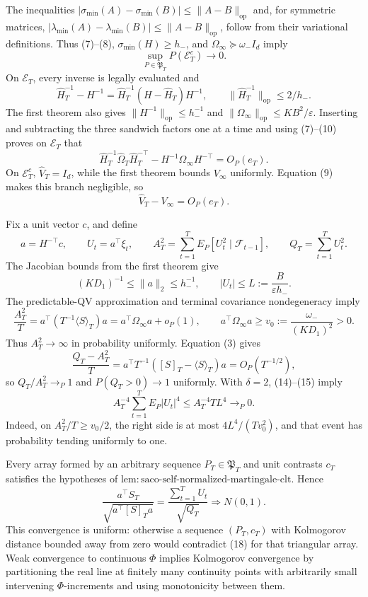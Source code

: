 The inequalities \(|\sigma_{\min}(A)-\sigma_{\min}(B)|\le\|A-B\|_{\mathrm{op}}\) and, for symmetric matrices, \(|\lambda_{\min}(A)-\lambda_{\min}(B)|\le\|A-B\|_{\mathrm{op}}\), follow from their variational definitions. Thus (7)--(8), \(\sigma_{\min}(H)\ge h_-\), and \(\Omega_\infty\succeq\omega_-I_d\) imply
\[
 \sup_{P\in\mathfrak P_T}P(\mathcal E_T^c)\longrightarrow0. \tag{9}
\]
On \(\mathcal E_T\), every inverse is legally evaluated and
\[
 \widehat H_T^{-1}-H^{-1}
 =\widehat H_T^{-1}(H-\widehat H_T)H^{-1},
 \qquad \|\widehat H_T^{-1}\|_{\mathrm{op}}\le2/h_-. \tag{10}
\]
The first theorem also gives \(\|H^{-1}\|_{\mathrm{op}}\le h_-^{-1}\) and \(\|\Omega_\infty\|_{\mathrm{op}}\le KB^2/\varepsilon\). Inserting and subtracting the three sandwich factors one at a time and using (7)--(10) proves on \(\mathcal E_T\) that
\[
 \widehat H_T^{-1}\widehat\Omega_T\widehat H_T^{-\top}
 -H^{-1}\Omega_\infty H^{-\top}=O_P(e_T). \tag{11}
\]
On \(\mathcal E_T^c\), \(\widehat V_T=I_d\), while the first theorem bounds \(V_\infty\) uniformly. Equation (9) makes this branch negligible, so
\[
 \widehat V_T-V_\infty=O_P(e_T). \tag{12}
\]

Fix a unit vector \(c\), and define
\[
 a=H^{-\top}c,\qquad U_t=a^\top\xi_t,\qquad
 A_T^2=\sum_{t=1}^TE_P[U_t^2\mid\mathcal F_{t-1}],\qquad
 Q_T=\sum_{t=1}^TU_t^2. \tag{13}
\]
The Jacobian bounds from the first theorem give
\[
 (KD_1)^{-1}\le\|a\|_2\le h_-^{-1},
 \qquad |U_t|\le L:=\frac{B}{\varepsilon h_-}. \tag{14}
\]
The predictable-QV approximation and terminal covariance nondegeneracy imply
\[
 \frac{A_T^2}{T}
 =a^\top(T^{-1}\langle S\rangle_T)a
 =a^\top\Omega_\infty a+o_P(1),
 \qquad a^\top\Omega_\infty a\ge v_0:=\frac{\omega_-}{(KD_1)^2}>0. \tag{15}
\]
Thus \(A_T^2\to\infty\) in probability uniformly. Equation (3) gives
\[
 \frac{Q_T-A_T^2}{T}
 =a^\top T^{-1}([S]_T-\langle S\rangle_T)a
 =O_P(T^{-1/2}), \tag{16}
\]
so \(Q_T/A_T^2\to_P1\) and \(P(Q_T>0)\to1\) uniformly. With \(\delta=2\), (14)--(15) imply
\[
 A_T^{-4}\sum_{t=1}^TE_P|U_t|^4
 \le A_T^{-4}TL^4\longrightarrow_P0. \tag{17}
\]
Indeed, on \(A_T^2/T\ge v_0/2\), the right side is at most \(4L^4/(Tv_0^2)\), and that event has probability tending uniformly to one.

Every array formed by an arbitrary sequence \(P_T\in\mathfrak P_T\) and unit contrasts \(c_T\) satisfies the hypotheses of \(\mathrm{lem:saco\text{-}self\text{-}normalized\text{-}martingale\text{-}clt}\). Hence
\[
 \frac{a^\top S_T}{\sqrt{a^\top[S]_Ta}}
 =\frac{\sum_{t=1}^TU_t}{\sqrt{Q_T}}\Rightarrow N(0,1). \tag{18}
\]
This convergence is uniform: otherwise a sequence \((P_T,c_T)\) with Kolmogorov distance bounded away from zero would contradict (18) for that triangular array. Weak convergence to continuous \(\Phi\) implies Kolmogorov convergence by partitioning the real line at finitely many continuity points with arbitrarily small intervening \(\Phi\)-increments and using monotonicity between them.


